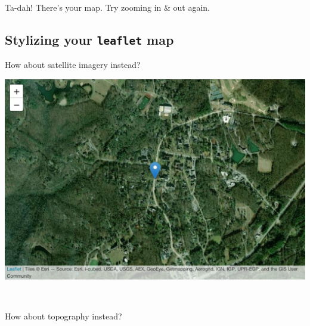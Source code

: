 \documentclass[
]{book}
\newenvironment{Shaded}{\begin{snugshade}}{\end{snugshade}}
\newcommand{\AttributeTok}[1]{\textcolor[rgb]{0.77,0.63,0.00}{#1}}
\newcommand{\FunctionTok}[1]{\textcolor[rgb]{0.00,0.00,0.00}{#1}}
\newcommand{\NormalTok}[1]{#1}
\newcommand{\SpecialCharTok}[1]{\textcolor[rgb]{0.00,0.00,0.00}{#1}}
\begin{document}
~

Ta-dah! There's your map. Try zooming in \& out again.

\hypertarget{stylizing-your-leaflet-map}{%
\subsection*{\texorpdfstring{Stylizing your \texttt{leaflet} map}{Stylizing your leaflet map}}\label{stylizing-your-leaflet-map}}

How about satellite imagery instead?

\begin{Shaded}
\end{Shaded}

\includegraphics[width=694.08px]{figures/unnamed-chunk-224-1}

~

How about topography instead?

\begin{Shaded}
\end{Shaded}
\end{document}
